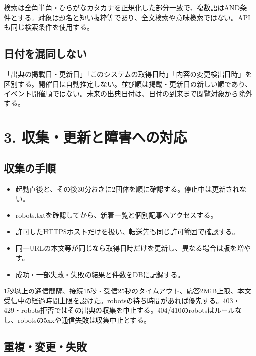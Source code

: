 \documentclass[a4paper,10pt]{ltjsarticle}
\begin{document}
検索は全角半角・ひらがなカタカナを正規化した部分一致で、複数語はAND条件とする。対象は題名と短い抜粋等であり、全文検索や意味検索ではない。APIも同じ検索条件を使用する。


\subsection*{日付を混同しない}

「出典の掲載日・更新日」「このシステムの取得日時」「内容の変更検出日時」を区別する。開催日は自動推定しない。並び順は掲載・更新日の新しい順であり、イベント開催順ではない。未来の出典日付は、日付の到来まで閲覧対象から除外する。


\clearpage

\section*{3. 収集・更新と障害への対応}

\subsection*{収集の手順}

\begin{itemize}

\item 起動直後と、その後30分おきに2団体を順に確認する。停止中は更新されない。

\item robots.txtを確認してから、新着一覧と個別記事へアクセスする。

\item 許可したHTTPSホストだけを扱い、転送先も同じ許可範囲で確認する。

\item 同一URLの本文等が同じなら取得日時だけを更新し、異なる場合は版を増やす。

\item 成功・一部失敗・失敗の結果と件数をDBに記録する。

\end{itemize}

1秒以上の通信間隔、接続15秒・受信25秒のタイムアウト、応答2MiB上限、本文受信中の経過時間上限を設けた。robotsの待ち時間があれば優先する。403・429・robots拒否ではその出典の収集を中止する。404/410のrobotsはルールなし、robotsの5xxや通信失敗は収集中止とする。


\subsection*{重複・変更・失敗}
\end{document}
